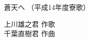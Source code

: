 \documentclass[10pt,b5j]{tarticle} %
\begin{document}
\begin{minipage}[c]{0.7\hsize} %
    \begin{center}
        {\LARGE
            蒼天へ %
        }
        {\small 
            （平成14年度寮歌） %
        }
    \end{center}
\end{minipage}
\begin{minipage}[c]{0.3\hsize} %
    \begin{flushright} %
        上川雄之君 作歌\\千葉直樹君 作曲 %
    \end{flushright}
\end{minipage}
\end{document}
